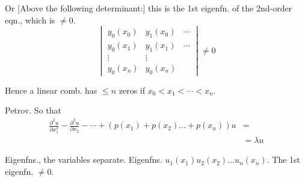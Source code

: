 \par\noindent\begin{minipage}{\linewidth}
Or
[Above the following determinant:] this is the 1st eigenfn. of the 2nd-order eqn., which is $\neq0$.
\begin{equation*}
\begin{vmatrix}
y_0(x_0)&y_1(x_0)&\cdots\\
y_0(x_1)&y_1(x_1)&\cdots\\
\vdots&\vdots&\\
y_0(x_n)&y_0(x_n)&
\end{vmatrix}\neq0
\end{equation*}
\end{minipage}\par
Hence a linear comb. has $\leq n$ zeros if $x_0<x_1<\cdots<x_n$.
\par\noindent\begin{minipage}{\linewidth}
Petrov. So that
\begin{equation*}
\begin{aligned}
\frac{\partial^2u}{\partial x_1^2}
-\frac{\partial^2u}{\partial x_2}-\cdots
+\left(p(x_1)+p(x_2)\ldots+p(x_n)\right)u&={}\\
&=\lambda u
\end{aligned}
\end{equation*}
\end{minipage}\par
Eigenfns., the variables separate.
Eigenfns. $u_1(x_1)u_2(x_2)\ldots u_n(x_n)$.
The 1st eigenfn. $\neq0$.

